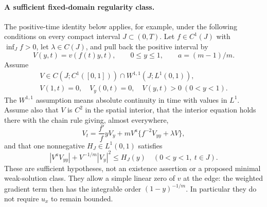 \documentclass[11pt,a4paper]{article}
\theoremstyle{remark}\newtheorem{remark}[theorem]{Remark}
\begin{document}
\paragraph{A sufficient fixed-domain regularity class.}
The positive-time identity below applies, for example, under the following
conditions on every compact interval $J\subset(0,T)$.
Let $f\in C^1(J)$ with $\inf_J f>0$, let $\lambda\in C(J)$, and pull back
the positive interval by
\[
 V(y,t)=v(f(t)y,t),\qquad 0\leq y\leq1,\qquad a=(m-1)/m.
\]
Assume
\[
 \begin{gathered}
 V\in C(J;C^1([0,1]))\cap W^{1,1}(J;L^1(0,1)),\\
 V(1,t)=0,\quad V_y(0,t)=0,\quad V(y,t)>0\ (0<y<1).
 \end{gathered}
\]
The $W^{1,1}$ assumption means absolute continuity in time with values
in $L^1$. Assume also that $V$ is $C^2$ in the spatial interior, that
the interior equation holds there with the chain rule giving, almost
everywhere,
\begin{equation}
 V_t=\frac{f'}f yV_y+
       mV^a\{f^{-2}V_{yy}+\lambda V\},
 \label{eq:fixedintervalchain}
\end{equation}
and that one nonnegative $H_J\in L^1(0,1)$ satisfies
\begin{equation}
 |V^aV_{yy}|+V^{-1/m}|V_y|^2\leq H_J(y)
 \quad(0<y<1,\ t\in J).
 \label{eq:weighteddomination}
\end{equation}
These are sufficient hypotheses, not an existence assertion or a proposed
minimal weak-solution class. They allow a simple linear zero of $v$ at
the edge: the weighted gradient term then has the integrable order
$(1-y)^{-1/m}$. In particular they do not require $u_x$ to remain bounded.
\end{document}
